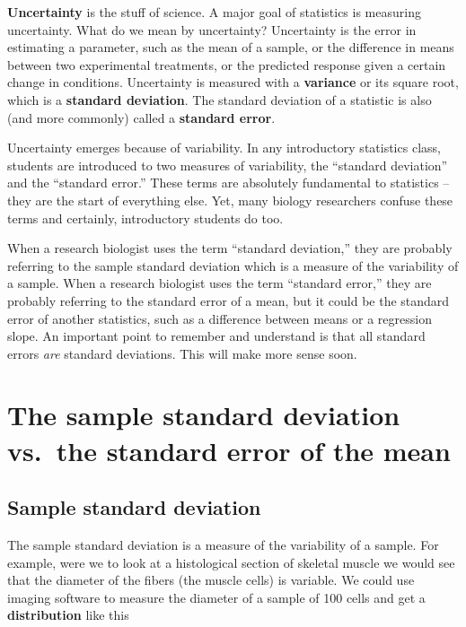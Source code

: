 \documentclass[]{book}
\begin{document}
\textbf{Uncertainty} is the stuff of science. A major goal of statistics
is measuring uncertainty. What do we mean by uncertainty? Uncertainty is
the error in estimating a parameter, such as the mean of a sample, or
the difference in means between two experimental treatments, or the
predicted response given a certain change in conditions. Uncertainty is
measured with a \textbf{variance} or its square root, which is a
\textbf{standard deviation}. The standard deviation of a statistic is
also (and more commonly) called a \textbf{standard error}.

Uncertainty emerges because of variability. In any introductory
statistics class, students are introduced to two measures of
variability, the ``standard deviation'' and the ``standard error.''
These terms are absolutely fundamental to statistics -- they are the
start of everything else. Yet, many biology researchers confuse these
terms and certainly, introductory students do too.

When a research biologist uses the term ``standard deviation,'' they are
probably referring to the sample standard deviation which is a measure
of the variability of a sample. When a research biologist uses the term
``standard error,'' they are probably referring to the standard error of
a mean, but it could be the standard error of another statistics, such
as a difference between means or a regression slope. An important point
to remember and understand is that all standard errors \emph{are}
standard deviations. This will make more sense soon.

\section{The sample standard deviation vs.~the standard error of the
mean}\label{the-sample-standard-deviation-vs.the-standard-error-of-the-mean}

\subsection{Sample standard deviation}\label{sample-standard-deviation}

The sample standard deviation is a measure of the variability of a
sample. For example, were we to look at a histological section of
skeletal muscle we would see that the diameter of the fibers (the muscle
cells) is variable. We could use imaging software to measure the
diameter of a sample of 100 cells and get a \textbf{distribution} like
this
\end{document}
